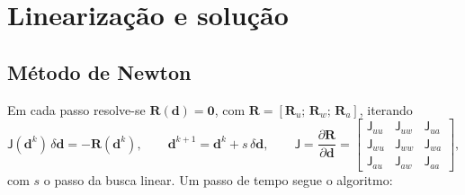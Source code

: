 \documentclass[11pt,a4paper]{article}
\newcommand{\mt}[1]{\mathsf{#1}}
\begin{document}
\section{Linearização e solução}
\label{sec:newton}

\subsection{Método de Newton}
Em cada passo resolve-se $\mathbf R(\mathbf d)=\mathbf 0$, com
$\mathbf R=[\mathbf R_u;\,\mathbf R_w;\,\mathbf R_a]$, iterando
\begin{equation}
\mt J(\mathbf d^{k})\,\delta\mathbf d=-\mathbf R(\mathbf d^{k}),\qquad
\mathbf d^{k+1}=\mathbf d^{k}+s\,\delta\mathbf d,\qquad
\mt J=\frac{\partial\mathbf R}{\partial\mathbf d}=
\begin{bmatrix}\mt J_{uu}&\mt J_{uw}&\mt J_{ua}\\\mt J_{wu}&\mt J_{ww}&\mt J_{wa}\\
\mt J_{au}&\mt J_{aw}&\mt J_{aa}\end{bmatrix},
\label{eq:newton}
\end{equation}
com $s$ o passo da busca linear. Um passo de tempo segue o algoritmo:
\end{document}
